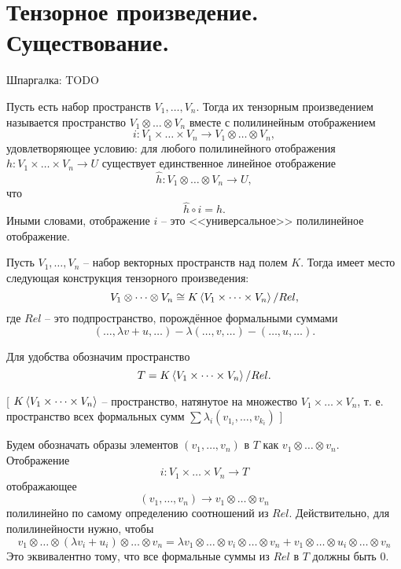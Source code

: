 \section{
 Тензорное произведение. Существование.
}

Шпаргалка: TODO

\dfn Пусть есть набор пространств $V_1, \dots,V_n$. Тогда их тензорным произведением называется пространство 
$V_1\otimes \dots \otimes V_n$ вместе с полилинейным отображением
$$i \colon V_1 \times \dots \times V_n \to V_1 \otimes \dots \otimes V_n,$$
удовлетворяющее условию: для любого полилинейного отображения $h\colon V_1\times \dots \times V_n \to U$ существует единственное линейное отображение 
$$\hat{h}\colon V_1\otimes \dots \otimes V_n \to U,$$
что 
$$\hat{h}\circ i=h.$$
Иными словами, отображение $i$ -- это <<универсальное>> полилинейное отображение.
\edfn 

\thrm Пусть $V_1,\dots,V_n$ -- набор векторных пространств над полем $K$. Тогда имеет место следующая конструкция тензорного произведения:
$$V_1 \otimes \dots \otimes V_n \cong K\left\langle V_1 \times \dots \times V_n \right\rangle / Rel,$$
где $Rel$ -- это подпространство, порождённое формальными суммами
$$(\dots, \lambda v+u, \dots) - \lambda (\dots,v, \dots) - (\dots, u, \dots).$$ 
\proof

Для удобства обозначим пространство
$$T=K\left\langle V_1 \times \dots \times V_n \right\rangle / Rel.$$

[ $K\left\langle V_1 \times \dots \times V_n \right\rangle$ -- пространство, натянутое на множество $V_1 \times \dots \times V_n$, т. е. пространство всех формальных сумм $\sum\lambda_i(v_{1_i}, \dots, v_{k_i})$  ]

Будем обозначать образы элементов $(v_1,\dots, v_n)$ в $T$ как  $v_1\otimes \dots \otimes v_n$. Отображение $$i \colon V_1\times \dots \times V_n \to T$$
отображающее 
$$(v_1,\dots,v_n) \to v_1\otimes \dots \otimes v_n$$
полилинейно по самому определению соотношений из $Rel$. Действительно, для полилинейности нужно, чтобы
$$v_1 \otimes \dots \otimes (\lambda v_i+u_i) \otimes \dots \otimes v_n =
\lambda v_1 \otimes \dots \otimes v_i \otimes \dots \otimes v_n +
v_1 \otimes \dots \otimes u_i \otimes \dots \otimes v_n$$
Это эквивалентно тому, что все формальные суммы из $Rel$ в $T$ должны быть 0.

